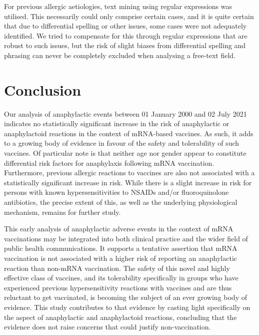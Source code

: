 \documentclass{article}
\begin{document}
For previous allergic aetiologies, text mining using regular expressions was utilised.
This necessarily could only comprise certain cases, and it is quite certain that due to differential spelling or other issues, some cases were not adequately identified.
We tried to compensate for this through regular expressions that are robust to such issues, but the risk of slight biases from differential spelling and phrasing can never be completely excluded when analysing a free-text field.

\section{Conclusion}

Our analysis of anaphylactic events between 01 January 2000 and 02 July 2021 indicates no statistically significant increase in the risk of anaphylactic or anaphylactoid reactions in the context of mRNA-based vaccines.
As such, it adds to a growing body of evidence in favour of the safety and tolerability of such vaccines.\cite{chu2021preliminary,baden2021efficacy,anderson2020safety}
Of particular note is that neither age nor gender appear to constitute differential risk factors for anaphylaxis following mRNA vaccination.
Furthermore, previous allergic reactions to vaccines are also not associated with a statistically significant increase in risk.
While there is a slight increase in risk for persons with known hypersensitivities to NSAIDs and/or fluoroquinolone antibiotics, the precise extent of this, as well as the underlying physiological mechanism, remains for further study.

This early analysis of anaphylactic adverse events in the context of mRNA vaccinations may be integrated into both clinical practice and the wider field of public health communications.
It supports a tentative assertion that mRNA vaccination is not associated with a higher risk of reporting an anaphylactic reaction than non-mRNA vaccination.
The safety of this novel and highly effective class of vaccines, and its tolerability specifically in groups who have experienced previous hypersensitivity reactions with vaccines and are thus reluctant to get vaccinated, is becoming the subject of an ever growing body of evidence.
This study contributes to that evidence by casting light specifically on the aspect of anaphylactic and anaphylactoid reactions, concluding that the evidence does not raise concerns that could justify non-vaccination.

\vspace{6pt}
\end{document}
